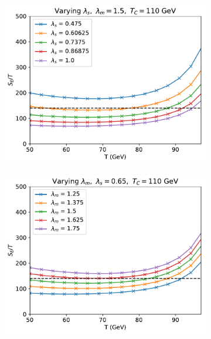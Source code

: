 \documentclass[final,3p,11pt,pdflatex]{elsarticle}
\begin{document}
\begin{figure}[h!]
\centering
  \begin{subfigure}[b]{0.49\textwidth}
    \includegraphics[width=\textwidth]{figures/nucleation_plot_lambda_s.pdf}
  \end{subfigure}
  \begin{subfigure}[b]{0.49\textwidth}
    \includegraphics[width=\textwidth]{figures/nucleation_plot_lambda_m.pdf}
  \end{subfigure}
  \\
  \begin{subfigure}[b]{0.49\textwidth}

\end{subfigure}
\end{figure}
\end{document}
